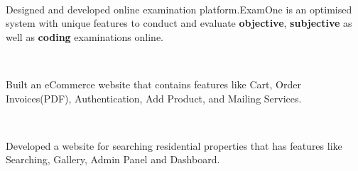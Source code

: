 \documentclass[]{deedy-resume-openfont}
\begin{document}
\begin{minipage}[t]{0.66\textwidth}
 \\
\begin{tightemize}
\item Designed and developed online examination platform.ExamOne is an optimised system with unique features to conduct and evaluate \textbf{objective}, \textbf{subjective} as well as \textbf{coding} examinations online.
\end{tightemize}

\vspace{3pt}

 \\
\begin{tightemize}
\item Built an eCommerce website that contains features like Cart, Order Invoices(PDF), Authentication, Add Product, and Mailing Services.
\end{tightemize}	    

\vspace{3pt}

 \\
\begin{tightemize}
\item Developed a website for searching residential properties that has features like Searching, Gallery, Admin Panel and Dashboard.

\end{tightemize}	    
\vspace{3pt}







\end{minipage}
\end{document}
